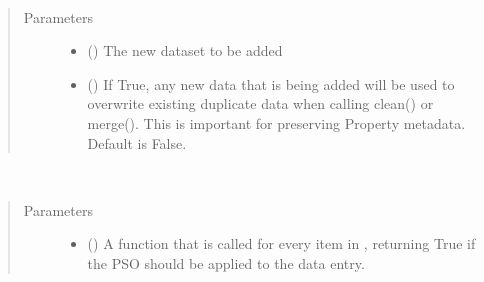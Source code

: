 \documentclass[letterpaper,10pt,english]{sphinxmanual}
\begin{document}
\begin{fulllineitems}
\begin{fulllineitems}
\label{\detokenize{dataset:colabfit.tools.dataset.Dataset.attach_dataset}}~\begin{quote}\begin{description}
\item[{Parameters}] \leavevmode\begin{itemize}
\item {} 
\sphinxAtStartPar
{} ({\hyperref[\detokenize{dataset:colabfit.tools.dataset.Dataset}]{}}) \textendash{} The new dataset to be added

\item {} 
\sphinxAtStartPar
{} () \textendash{} If True, any new data that is being added will be used to
overwrite existing duplicate data when calling clean() or
merge(). This is important for preserving Property metadata.
Default is False.

\end{itemize}

\end{description}\end{quote}

\end{fulllineitems}


\begin{fulllineitems}
\label{\detokenize{dataset:colabfit.tools.dataset.Dataset.attach_property_settings}}~\begin{quote}\begin{description}
\item[{Parameters}] \leavevmode\begin{itemize}
\item {} 
\sphinxAtStartPar
{} () \textendash{} A function that is called for every item in ,
returning True if the PSO should be applied to the data entry.


\end{itemize}
\end{description}
\end{quote}
\end{fulllineitems}
\end{fulllineitems}
\end{document}
